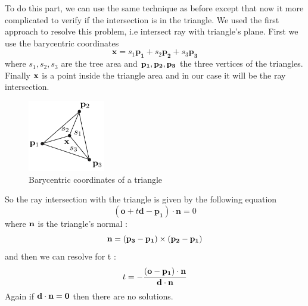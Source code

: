 \documentclass[10pt,a4paper]{report}
\begin{document}
To do this part, we can use the same technique as before except that now it more complicated to verify if the intersection is in the triangle. We used the first approach to resolve this problem, i.e intersect ray with triangle's plane.
First we use the barycentric coordinates $$ \mathbf{x} = s_1 \mathbf{p_1} + s_2 \mathbf{p_2} + s_3 \mathbf{p_3}$$ where $s_1, s_2, s_3$ are the tree area and $\bf p_1, p_2, p_3$ the three vertices of the triangles. Finally $\bf x$ is a point inside the triangle area and in our case it will be the ray intersection.

\begin{figure}[h!]
\caption{Barycentric coordinates of a triangle}
  \centering
    \includegraphics[width=0.3\textwidth]{triangle.png}
\end{figure}

So the ray intersection with the triangle is given by the following equation $$ (\mathbf{o} + t \mathbf{d} - \mathbf{p_1}) \cdot \mathbf{n} = 0$$ where $\bf n$ is the triangle's normal : $$\mathbf{n} = (\bf p_3 - p_1) \times (p_2 - p_1)$$ and then we can resolve for t : $$ t = - {{(\bf o - \bf p_1) \cdot \bf n} \over {\bf d \cdot \bf n}}$$
Again if ${\bf d \cdot \bf n = 0}$ then there are no solutions.
\end{document}
